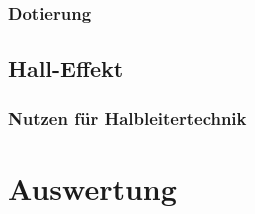 \documentclass[numbers=noenddot,12pt,a4paper]{scrartcl}
\begin{document}
\subsubsection{Dotierung}
\subsection{Hall-Effekt}
\subsubsection{Nutzen für Halbleitertechnik}
\section{Auswertung}
\end{document}
